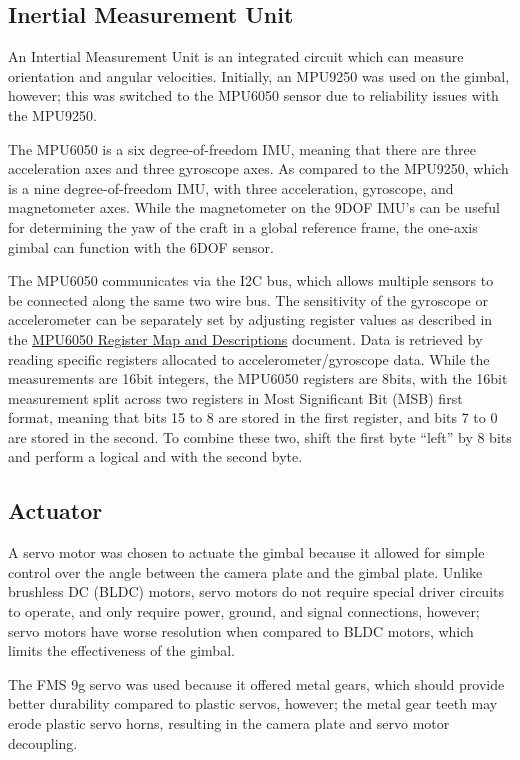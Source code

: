 \documentclass[11pt]{article} %
\begin{document}
\subsection{Inertial Measurement Unit}
An Intertial Measurement Unit is an integrated circuit which can measure orientation and angular velocities. Initially, an MPU9250 was used on the gimbal, however; this was switched to the MPU6050 sensor due to reliability issues with the MPU9250. 

The MPU6050 is a six degree-of-freedom IMU, meaning that there are three acceleration axes and three gyroscope axes. As compared to the MPU9250, which is a nine degree-of-freedom IMU, with three acceleration, gyroscope, and magnetometer axes. While the magnetometer on the 9DOF IMU's can be useful for determining the yaw of the craft in a global reference frame, the one-axis gimbal can function with the 6DOF sensor. 

The MPU6050 communicates via the I2C bus, which allows multiple sensors to be connected along the same two wire bus. The sensitivity of the gyroscope or accelerometer can be separately set by adjusting register values as described in the \href{https://www.invensense.com/wp-content/uploads/2015/02/MPU-6000-Register-Map1.pdf}{MPU6050 Register Map and Descriptions} document. Data is retrieved by reading specific registers allocated to accelerometer/gyroscope data. While the measurements are 16bit integers, the MPU6050 registers are 8bits, with the 16bit measurement split across two registers in Most Significant Bit (MSB) first format, meaning that bits 15 to 8 are stored in the first register, and bits 7 to 0 are stored in the second. To combine these two, shift the first byte ``left'' by 8 bits and perform a logical and with the second byte. 

\subsection{Actuator}
A servo motor was chosen to actuate the gimbal because it allowed for simple control over the angle between the camera plate and the gimbal plate. Unlike brushless DC (BLDC) motors, servo motors do not require special driver circuits to operate, and only require power, ground, and signal connections, however; servo motors have worse resolution when compared to BLDC motors, which limits the effectiveness of the gimbal.

The FMS 9g servo was used because it offered metal gears, which should provide better durability compared to plastic servos, however; the metal gear teeth may erode plastic servo horns, resulting in the camera plate and servo motor decoupling.  
\end{document}
